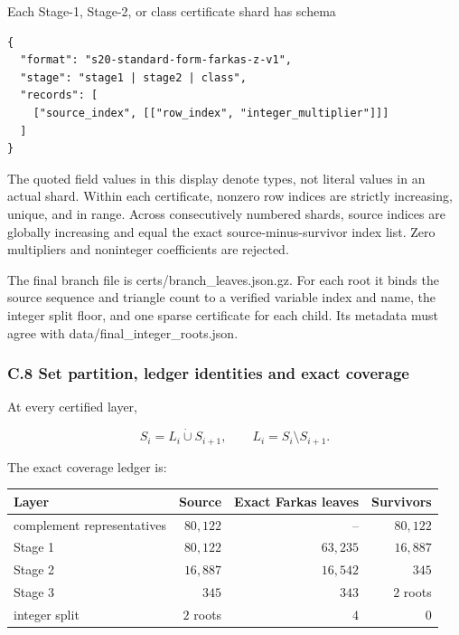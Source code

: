 \documentclass[
  english,
  11pt,
  a4paper,
]{article}
\newcounter{none} %
\begin{document}
Each Stage-1, Stage-2, or class certificate shard has schema

\begin{verbatim}
{
  "format": "s20-standard-form-farkas-z-v1",
  "stage": "stage1 | stage2 | class",
  "records": [
    ["source_index", [["row_index", "integer_multiplier"]]]
  ]
}
\end{verbatim}

The quoted field values in this display denote types, not literal values
in an actual shard. Within each certificate, nonzero row indices are
strictly increasing, unique, and in range. Across consecutively numbered
shards, source indices are globally increasing and equal the exact
source-minus-survivor index list. Zero multipliers and noninteger
coefficients are rejected.

The final branch file is certs/branch\_leaves.json.gz. For each root it
binds the source sequence and triangle count to a verified variable
index and name, the integer split floor, and one sparse certificate for
each child. Its metadata must agree with
data/final\_integer\_roots.json.

\subsubsection{C.8 Set partition, ledger identities and exact
coverage}\label{c.8-set-partition-ledger-identities-and-exact-coverage}

At every certified layer,

\[
S_i=L_i\mathbin{\dot\cup}S_{i+1},\qquad
L_i=S_i\setminus S_{i+1}.
\tag{C.46}
\]

The exact coverage ledger is:

{\def\LTcaptype{none} %
\begin{longtable}[]{@{}lrrr@{}}
\toprule\noalign{}
Layer & Source & Exact Farkas leaves & Survivors \\
\midrule\noalign{}
\endhead
\bottomrule\noalign{}
\endlastfoot
complement representatives & \(80{,}122\) & -- & \(80{,}122\) \\
Stage 1 & \(80{,}122\) & \(63{,}235\) & \(16{,}887\) \\
Stage 2 & \(16{,}887\) & \(16{,}542\) & \(345\) \\
Stage 3 & \(345\) & \(343\) & \(2\) roots \\
integer split & \(2\) roots & \(4\) & \(0\) \\
\end{longtable}
}
\end{document}
